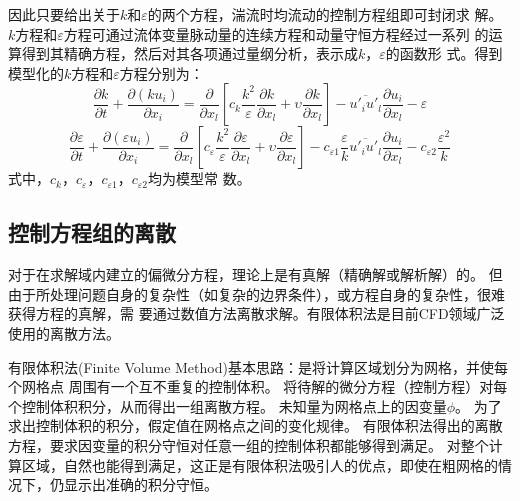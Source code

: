 因此只要给出关于$k$和$\varepsilon$的两个方程，湍流时均流动的控制方程组即可封闭求
解。
$k$方程和$\varepsilon$方程可通过流体变量脉动量的连续方程和动量守恒方程经过一系列
的运算得到其精确方程，然后对其各项通过量纲分析，表示成$k$，$\varepsilon$的函数形
式。得到模型化的$k$方程和$\varepsilon$方程分别为：
\begin{equation}
  \frac{{\partial k}}{{\partial t}} + \frac{{\partial \left( {k{u_i}} \right)}}{{\partial {x_i}}} =
    \frac{\partial }{{\partial {x_l}}}\left[ {{c_k}\frac{{{k^2}}}{\varepsilon }\frac{{\partial k}}{{\partial {x_l}}} +\upsilon \frac{{\partial k}}{{\partial {x_l}}}} \right] - \overline {{{u'}_i}{{u'}_l}} \frac{{\partial {u_i}}}{{\partial {x_l}}} - \varepsilon
\end{equation}
\begin{equation}
  \frac{{\partial \varepsilon }}{{\partial t}} + \frac{{\partial \left( {\varepsilon {u_i}} \right)}}{{\partial {x_i}}} =
    \frac{\partial }{{\partial {x_l}}}\left[ {{c_\varepsilon }\frac{{{k^2}}}{\varepsilon }\frac{{\partial \varepsilon }}{{\partial {x_l}}} +
        \upsilon \frac{{\partial \varepsilon }}{{\partial {x_l}}}} \right] -
    {c_{\varepsilon 1}}\frac{\varepsilon }{k}\overline {{{u'}_i}{{u'}_l}} \frac{{\partial {u_i}}}{{\partial {x_l}}} -
    {c_{\varepsilon 2}}\frac{{{\varepsilon ^2}}}{k}
\end{equation}
式中，$c_k$，$c_\varepsilon$，$c_{\varepsilon 1}$，$c_{\varepsilon 2}$均为模型常
数。

\subsection{控制方程组的离散}
对于在求解域内建立的偏微分方程，理论上是有真解（精确解或解析解）的。
但由于所处理问题自身的复杂性（如复杂的边界条件），或方程自身的复杂性，很难获得方程的真解，需
要通过数值方法离散求解。有限体积法是目前CFD领域广泛使用的离散方法。

有限体积法(Finite Volume Method)基本思路：是将计算区域划分为网格，并使每个网格点
周围有一个互不重复的控制体积。
将待解的微分方程（控制方程）对每个控制体积积分，从而得出一组离散方程。
未知量为网格点上的因变量$\phi$。
为了求出控制体积的积分，假定值在网格点之间的变化规律。
有限体积法得出的离散方程，要求因变量的积分守恒对任意一组的控制体积都能够得到满足。
对整个计算区域，自然也能得到满足，这正是有限体积法吸引人的优点，即使在粗网格的情
况下，仍显示出准确的积分守恒。

